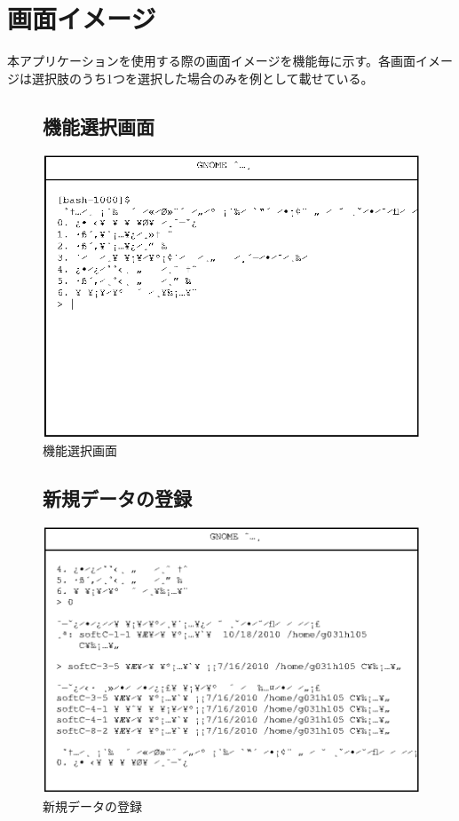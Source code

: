 \documentclass[a4j]{jarticle}
\begin{document}
\section{画面イメージ}
本アプリケーションを使用する際の画面イメージを機能毎に示す。各画面イメージは選択肢のうち1つを選択した場合のみを例として載せている。
\begin{figure}[h]
\subsection{機能選択画面}
\includegraphics{template.eps}
\caption{機能選択画面}
\end{figure}

\begin{figure}[h]
\subsection{新規データの登録}
\includegraphics{new_program.eps}
\caption{新規データの登録}
\end{figure}
\end{document}

